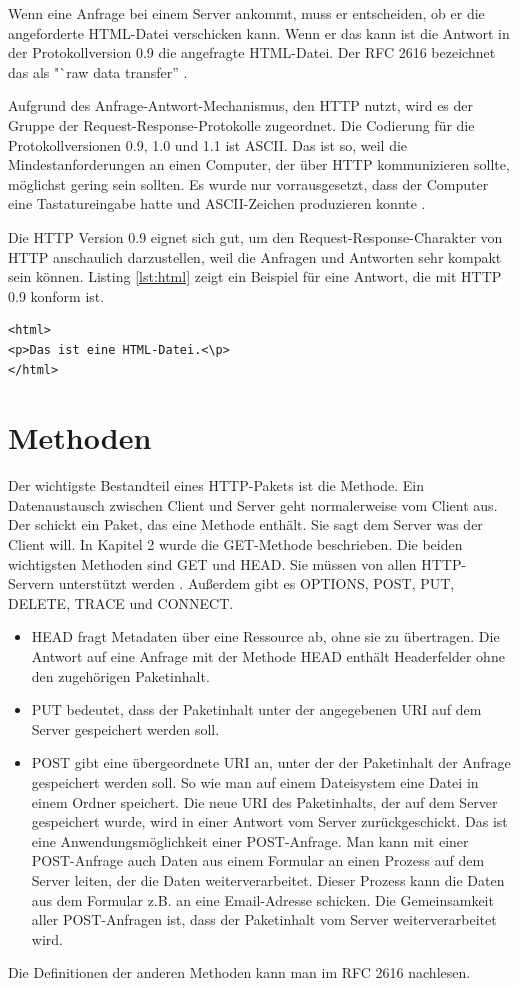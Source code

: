 \documentclass{llncs}
\begin{document}
Wenn eine Anfrage bei einem Server ankommt, muss er entscheiden, ob er die angeforderte HTML-Datei verschicken kann. Wenn er das kann ist die Antwort in der Protokollversion 0.9 die angefragte HTML-Datei. Der RFC 2616 bezeichnet das als "`raw data transfer'' \cite{Fielding1999}.

Aufgrund des Anfrage-Antwort-Mechanismus, den HTTP nutzt, wird es der Gruppe der Request-Response-Protokolle zugeordnet. Die Codierung für die Protokollversionen 0.9, 1.0 und 1.1 ist ASCII. Das ist so, weil die Mindestanforderungen an einen Computer, der über HTTP kommunizieren sollte, möglichst gering sein sollten. Es wurde nur vorrausgesetzt, dass der Computer eine Tastatureingabe hatte und ASCII-Zeichen produzieren konnte \cite{Berners-Lee1999}.

Die HTTP Version 0.9 eignet sich gut, um den Request-Response-Charakter von HTTP anschaulich darzustellen, weil die Anfragen und Antworten sehr kompakt sein können. Listing \ref{lst:html} zeigt ein Beispiel für eine Antwort, die mit HTTP 0.9 konform ist.

\begin{lstlisting}[caption={Antwort-Paket nach HTTP 0.9},label={lst:html}]
<html>
<p>Das ist eine HTML-Datei.<\p>
</html>
\end{lstlisting}

\section{Methoden}
Der wichtigste Bestandteil eines HTTP-Pakets ist die Methode. Ein Datenaustausch zwischen Client und Server geht normalerweise vom Client aus. Der schickt ein Paket, das eine Methode enthält. Sie sagt dem Server was der Client will. In Kapitel 2 wurde die GET-Methode beschrieben. Die beiden wichtigsten Methoden sind GET und HEAD. Sie müssen von allen HTTP-Servern unterstützt werden \cite{Fielding1999}. Außerdem gibt es OPTIONS, POST, PUT, DELETE, TRACE und CONNECT. 

\begin{itemize}  
\item HEAD fragt Metadaten über eine Ressource ab, ohne sie zu übertragen. Die Antwort auf eine Anfrage mit der Methode HEAD enthält Headerfelder ohne den zugehörigen Paketinhalt.
\item PUT bedeutet, dass der Paketinhalt unter der angegebenen URI auf dem Server gespeichert werden soll. 
\item POST gibt eine übergeordnete URI an, unter der der Paketinhalt der Anfrage gespeichert werden soll. So wie man auf einem Dateisystem eine Datei in einem Ordner speichert. Die neue URI des Paketinhalts, der auf dem Server gespeichert wurde, wird in einer Antwort vom Server zurückgeschickt. Das ist eine Anwendungsmöglichkeit einer POST-Anfrage. Man kann mit einer POST-Anfrage auch Daten aus einem Formular an einen Prozess auf dem Server leiten, der die Daten weiterverarbeitet. Dieser Prozess kann die Daten aus dem Formular z.B. an eine Email-Adresse schicken.
Die Gemeinsamkeit aller POST-Anfragen ist, dass der Paketinhalt vom Server weiterverarbeitet wird.
\end{itemize}
Die Definitionen der anderen Methoden kann man im RFC 2616 nachlesen.
\end{document}
